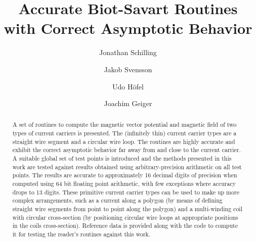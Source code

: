 \documentclass[preprint,12pt]{elsarticle}
\begin{document}
\begin{frontmatter}



\title{Accurate Biot-Savart Routines with Correct Asymptotic Behavior}


\author[a]{Jonathan Schilling}
\author[a]{Jakob Svensson}
\author[a]{Udo Höfel}
\author[a]{Joachim Geiger}

\address[a]{Max-Planck-Institute for Plasma Physics, Wendelsteinstrasse 1, 17489 Greifswald, Germany}

\begin{abstract}
A set of routines to compute the magnetic vector potential and magnetic field of two types of current carriers is presented.
The (infinitely thin) current carrier types are a straight wire segment and a circular wire loop.
The routines are highly accurate and exhibit the correct asymptotic behavior far away from and close to the current carrier.
A suitable global set of test points is introduced and the methods presented in this work
are tested against results obtained using arbitrary-precision arithmetic on all test points.
The results are accurate to approximately 16 decimal digits of precision when computed using 64 bit floating point arithmetic,
with few exceptions where accuracy drops to 13 digits.
These primitive current carrier types can be used to make up more complex arrangements,
such as a current along a polygon (by means of defining straight wire segments from point to point along the polygon)
and a multi-winding coil with circular cross-section (by positioning circular wire loops at appropriate positions in the coils cross-section).
Reference data is provided along with the code to compute it
for testing the reader's routines against this work.
\end{abstract}


\end{frontmatter}
\end{document}

